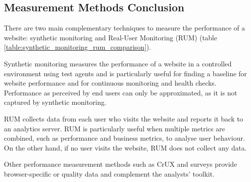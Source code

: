 



\subsection{Measurement Methods Conclusion} %

There are two main complementary techniques to measure the performance of a website: synthetic monitoring and Real-User Monitoring (RUM) (table \ref{table:synthetic_monitoring_rum_comparison}).

Synthetic monitoring measures the performance of a website in a controlled environment using test agents and is particularly useful for finding a baseline for website performance and for continuous monitoring and health checks.
Performance as perceived by end users can only be approximated, as it is not captured by synthetic monitoring.

RUM collects data from each user who visits the website and reports it back to an analytics server.
RUM is particularly useful when multiple metrics are combined, such as performance and business metrics, to analyse user behaviour.
On the other hand, if no user visits the website, RUM does not collect any data.

Other performance measurement methods such as CrUX and surveys provide browser-specific or quality data and complement the analysts' toolkit.

